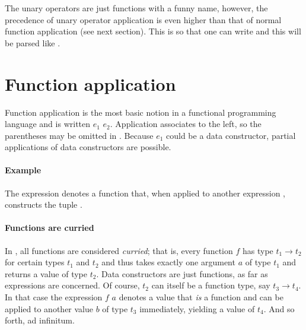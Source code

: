 The unary operators are just functions with a funny name, however, the precedence of unary operator application is even higher than that of normal function application (see next section). This is so that one can write  and this will be parsed like .


\section{Function application}  \label{funapp} 

\begin{flushleft}
  \alt {} 
\end{flushleft}

Function application is the most basic notion in a functional programming language and is written $e_1$ $e_2$.
Application associates to the left, so the parentheses may be omitted in .
Because $e_1$ could be a data constructor, partial applications of data constructors are possible.

\paragraph{Example}
The expression 
denotes a function that, when applied to another expression , constructs the tuple .


\paragraph*{Functions are curried}

In \frege{}, all functions are considered \emph{curried}; that is, every function $f$ has type $t_1 \rightarrow{} t_2$ for certain types $t_1$ and $t_2$ and thus takes exactly one argument $a$ of type $t_1$ and returns a value of type $t_2$.
Data constructors are just functions, as far as expressions are concerned.
Of course, $t_2$ can itself be a function type, say $t_3 \rightarrow{} t_4$.
In that case the expression $f$ $a$ denotes a value that \emph{is} a function and can be applied to another value $b$ of type $t_3$ immediately, yielding a value of $t_4$. And so forth, ad infinitum.

